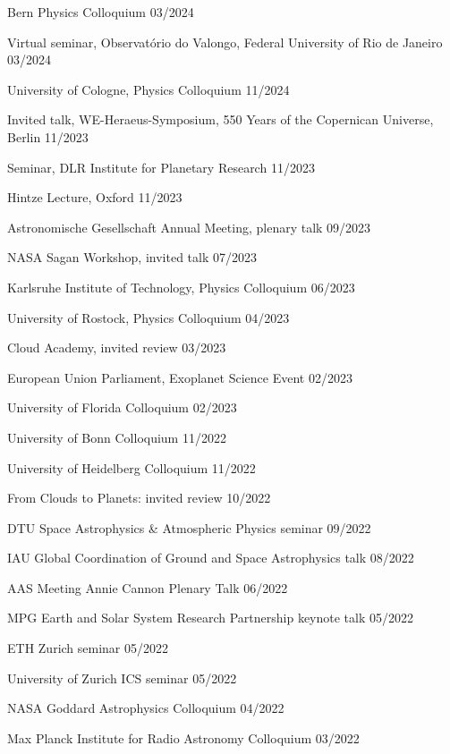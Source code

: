 \documentclass[12pt,letterpaper]{article}
\begin{document}
\begin{list}{}{\cvlist}
\item {Bern Physics Colloquium \hfill 03/2024}
\item {Virtual seminar, Observatório do Valongo, Federal University of Rio de Janeiro \hfill 03/2024}
\item {University of Cologne, Physics Colloquium \hfill 11/2024}
\item {Invited talk, WE-Heraeus-Symposium, 550 Years of the Copernican Universe, Berlin \hfill 11/2023}
\item {Seminar, DLR Institute for Planetary Research \hfill 11/2023}
\item {Hintze Lecture, Oxford \hfill 11/2023}
\item {Astronomische Gesellschaft Annual Meeting, plenary talk \hfill 09/2023}
\item {NASA Sagan Workshop, invited talk \hfill 07/2023}
\item {Karlsruhe Institute of Technology, Physics Colloquium \hfill 06/2023}
\item {University of Rostock, Physics Colloquium \hfill 04/2023}
\item {Cloud Academy, invited review \hfill 03/2023}
\item {European Union Parliament, Exoplanet Science Event \hfill 02/2023}
\item {University of Florida Colloquium \hfill 02/2023}
\item {University of Bonn Colloquium \hfill 11/2022}
\item {University of Heidelberg Colloquium \hfill 11/2022}
\item {From Clouds to Planets: invited review \hfill 10/2022}
\item {DTU Space Astrophysics \& Atmospheric Physics seminar \hfill 09/2022}
\item {IAU Global Coordination of Ground and Space Astrophysics talk \hfill 08/2022}
\item {AAS Meeting Annie Cannon Plenary Talk \hfill 06/2022}
\item {MPG Earth and Solar System Research Partnership keynote talk \hfill 05/2022}
\item {ETH Zurich seminar \hfill 05/2022}
\item {University of Zurich ICS seminar \hfill 05/2022}
\item {NASA Goddard Astrophysics Colloquium \hfill 04/2022}
\item {Max Planck Institute for Radio Astronomy Colloquium \hfill 03/2022}

\end{list}
\end{document}
